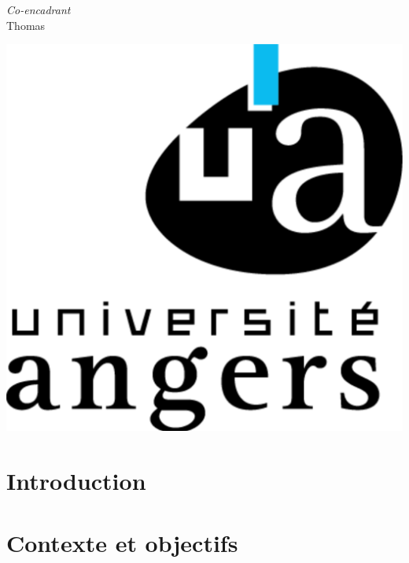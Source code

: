 \documentclass{report}
\begin{document}
\begin{titlepage}
\begin{center}
	\vspace{0.5cm}
	\emph{Co-encadrant}\\
	Thomas \\

	\end{center}		
	
	\vspace{2.91cm}
	
	\hspace{14.4cm} \includegraphics[scale = 0.07]{images/ua.png}



    
    
\end{titlepage}

\newpage\null\thispagestyle{empty}\newpage



\newpage\null\thispagestyle{empty}\newpage

\tableofcontents

\chapter*{Introduction}
	

\newpage\null\thispagestyle{empty}\newpage


\chapter{Contexte et objectifs}
\end{document}

